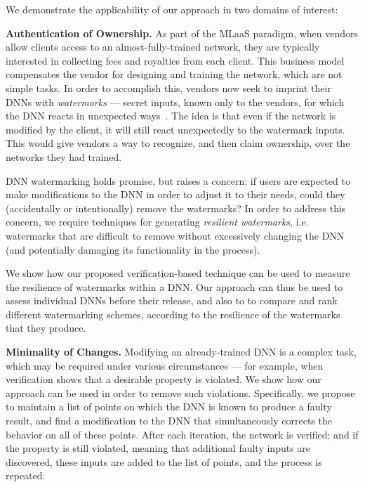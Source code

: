 \documentclass{easychair}
\begin{document}

We demonstrate the applicability of our approach in two domains of interest:

\medskip\noindent
\textbf{Authentication of Ownership.}
As part of the MLaaS paradigm, when vendors allow clients access to an almost-fully-trained network,
they are typically interested in collecting fees and royalties from
each client. This business model compensates the vendor for designing
and training the network, which are not simple tasks. In order to
accomplish this, vendors now seek to imprint their DNNs with
\emph{watermarks} --- secret inputs, known only to the vendors, for which the DNN reacts in
unexpected ways~\cite{AdBaPiKeWatermarking}. The idea is that even if the network is modified by
the client, it will still react unexpectedly to the watermark inputs. This would give vendors a way to
recognize, and then claim ownership, over the networks they had
trained.

DNN watermarking holds promise, but raises a concern: if users are
expected to make modifications to the DNN in order to adjust it to
their needs, could they (accidentally or intentionally) remove the
watermarks? In order to address this concern, we require techniques
for generating \emph{resilient watermarks}, i.e. watermarks that are
difficult to remove without excessively changing the DNN (and
potentially damaging its functionality in the process).

We show how our proposed verification-based technique can be used to
measure the resilience of watermarks within a DNN. Our approach can
thus be used to assess individual DNNs before their release, and also to
to compare and rank different watermarking schemes, according to
the resilience of the watermarks that they produce.

\medskip\noindent \textbf{Minimality of Changes.}
Modifying an already-trained DNN is a complex task, which may be
required under various circumstances --- for example, when
verification shows that a desirable property is violated. 
We show how our approach can be used in order to remove such
violations. Specifically, we propose to maintain a list of points on which
the DNN is known to produce a faulty result, and find a modification
to the DNN that simultaneously corrects the behavior on all of these
points. After each iteration, the network is verified; and if
the property is still violated, meaning that additional faulty inputs
are discovered, these inputs are added to the list of
points, and the process is repeated.
\end{document}
